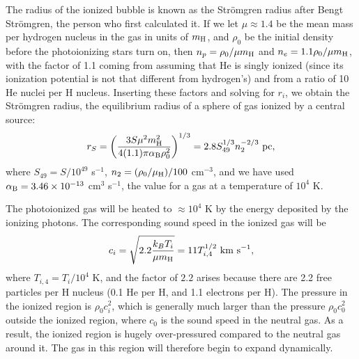 The radius of the ionized bubble is known as the Str\"omgren radius after Bengt Str\"omgren, the person who first calculated it. If we let $\mu\approx 1.4$ be the mean mass per hydrogen nucleus in the gas in units of $m_{\rm H}$, and $\rho_0$ be the initial density before the photoionizing stars turn on, then $n_p = \rho_0/\mu m_{\rm H}$ and $n_e = 1.1 \rho_0/\mu m_{\rm H}$, with the factor of 1.1 coming from assuming that He is singly ionized (since its ionization potential is not that different from hydrogen's) and from a ratio of 10 He nuclei per H nucleus. Inserting these factors and solving for $r_i$, we obtain the Str\"omgren radius, the equilibrium radius of a sphere of gas ionized by a central source:
\begin{equation}
r_S = \left(\frac{3 S \mu^2 m_{\rm H}^2}{4(1.1) \pi \alpha_{\mathrm{B}} \rho_0^2}\right)^{1/3} = 2.8 S_{49}^{1/3} n_2^{-2/3}\mbox{ pc},
\end{equation}
where $S_{49} = S/10^{49}$ s$^{-1}$, $n_2 = (\rho_0/\mu_{\rm H})/100$ cm$^{-3}$, and we have used $\alpha_{\mathrm{B}} = 3.46\times 10^{-13}$ cm$^3$ s$^{-1}$, the value for a gas at a temperature of $10^4$ K.

The photoionized gas will be heated to $\approx 10^4$ K by the energy deposited by the ionizing photons. The corresponding sound speed in the ionized gas will be
\begin{equation}
c_i = \sqrt{2.2 \frac{k_B T_i}{\mu m_{\rm H}}} = 11 T_{i,4}^{1/2}\mbox{ km s}^{-1},
\end{equation}
where $T_{i,4} = T_i/10^4$ K, and the factor of $2.2$ arises because there are 2.2 free particles per H nucleus (0.1 He per H, and 1.1 electrons per H). The pressure in the ionized region is $\rho_0 c_i^2$, which is generally much larger than the pressure $\rho_0 c_0^2$ outside the ionized region, where $c_0$ is the sound speed in the neutral gas. As a result, the ionized region is hugely over-pressured compared to the neutral gas around it. The gas in this region will therefore begin to expand dynamically.

